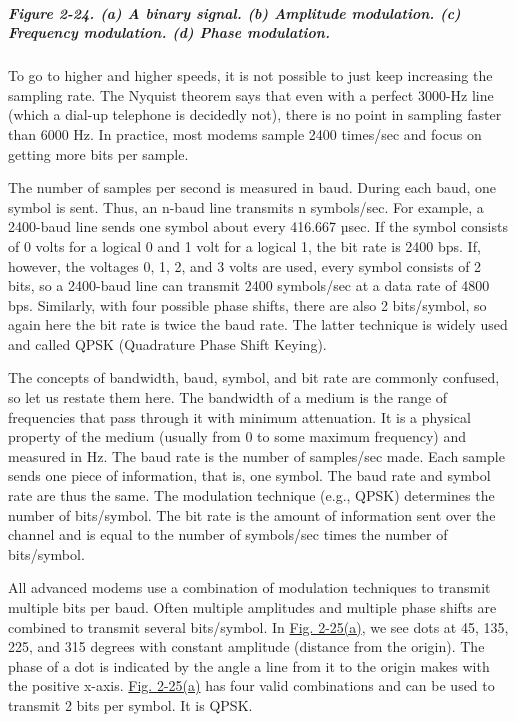 \documentclass[b5paper,11pt]{memoir}
\begin{document}
\subparagraph[Figure 2-24. (a) A binary signal. (b) Amplitude
modulation. (c) Frequency modulation. (d) Phase
modulation.]{\texorpdfstring{\protect\hypertarget{0130661023_ch02lev1sec5.htmlux5cux23ch02fig24}{}{}Figure
2-24. (a) A binary signal. (b) Amplitude modulation. (c) Frequency
modulation. (d) Phase
modulation.}{Figure 2-24. (a) A binary signal. (b) Amplitude modulation. (c) Frequency modulation. (d) Phase modulation.}}


To go to higher and higher speeds, it is not possible to just keep
increasing the sampling rate. The Nyquist theorem says that even with a
perfect 3000-Hz line (which a dial-up telephone is decidedly not), there
is no point in sampling faster than 6000 Hz. In practice, most modems
sample 2400 times/sec and focus on getting more bits per sample.

The number of samples per second is measured in {baud}. During each
baud, one {symbol} is sent. Thus, an {n}-baud line transmits {n}
symbols/sec. For example, a 2400-baud line sends one symbol about every
416.667 µsec. If the symbol consists of 0 volts for a logical 0 and 1
volt for a logical 1, the bit rate is 2400 bps. If, however, the
voltages 0, 1, 2, and 3 volts are used, every symbol consists of 2 bits,
so a 2400-baud line can transmit 2400 symbols/sec at a data rate of 4800
bps. Similarly, with four possible phase shifts, there are also 2
bits/symbol, so again here the bit rate is twice the baud rate. The
latter technique is widely used and called {QPSK} ({Quadrature Phase
Shift Keying}).

The concepts of bandwidth, baud, symbol, and bit rate are commonly
confused, so let us restate them here. The bandwidth of a medium is the
range of frequencies that pass through it with minimum attenuation. It
is a physical property of the medium (usually from 0 to some maximum
frequency) and measured in Hz. The baud rate is the number of
samples/sec made. Each sample sends one piece of information, that is,
one symbol. The baud rate and symbol rate are thus the same. The
modulation technique (e.g., QPSK) determines the number of bits/symbol.
The bit rate is the amount of information sent over the channel and is
equal to the number of symbols/sec times the number of bits/symbol.

All advanced modems use a combination of modulation techniques to
transmit multiple bits per baud. Often multiple amplitudes and multiple
phase shifts are combined to transmit several bits/symbol. In
\protect\hyperlink{0130661023_ch02lev1sec5.htmlux5cux23ch02fig25}{Fig.
2-25(a)}, we see dots at 45, 135, 225, and 315 degrees with constant
amplitude (distance from the origin). The phase of a dot is indicated by
the angle a line from it to the origin makes with the positive x-axis.
\protect\hyperlink{0130661023_ch02lev1sec5.htmlux5cux23ch02fig25}{Fig.
2-25(a)} has four valid combinations and can be used to transmit 2 bits
per symbol. It is QPSK.
\end{document}
